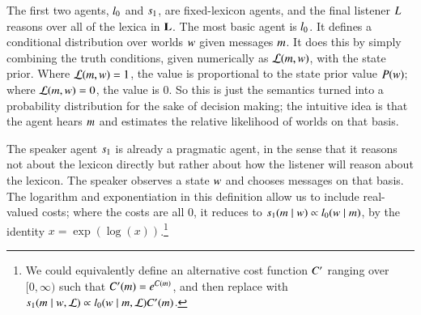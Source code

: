 \documentclass[leqno,12pt]{article}
\begin{document}
The first two agents, $l_{0}$ and $s_{1}$, are
fixed-lexicon agents, and the final listener $L_{}$
reasons over all of the lexica in $\mathbf{L}$.  The most basic agent is
$l_{0}$. It defines a conditional distribution over worlds
$w$ given messages $m$. It does this by simply combining the
truth conditions, given numerically as $\mathcal{L}(m, w)$, with the
state prior. Where $\mathcal{L}(m, w)=1$, the value is proportional
to the state prior value $P(w)$; where
$\mathcal{L}(m, w)=0$, the value is $0$. So this is just the
semantics turned into a probability distribution for the sake of
decision making; the intuitive idea is that the agent hears $m$ and
estimates the relative likelihood of worlds on that basis.

The speaker agent $s_{1}$ is already a pragmatic agent, in the
sense that it reasons not about the lexicon directly but rather about
how the listener will reason about the lexicon. The speaker observes a
state $w$ and chooses messages on that basis. The logarithm and
exponentiation in this definition allow us to include real-valued
costs; where the costs are all $0$, it reduces to
$s_{1}(m \mid w) \propto l_{0}(w \mid
m)$,
by the identity $x = \exp(\log(x))$.\footnote{We could equivalently define an
alternative cost function $C'$ ranging over $[0,\infty)$ such
that $C'(m)=e^{C(m)}$, and then replace
 with
$s_{1}(m \mid w, \mathcal{L}) \propto l_{0}(w
\mid m,\mathcal{L})C'(m)$.}
\end{document}

